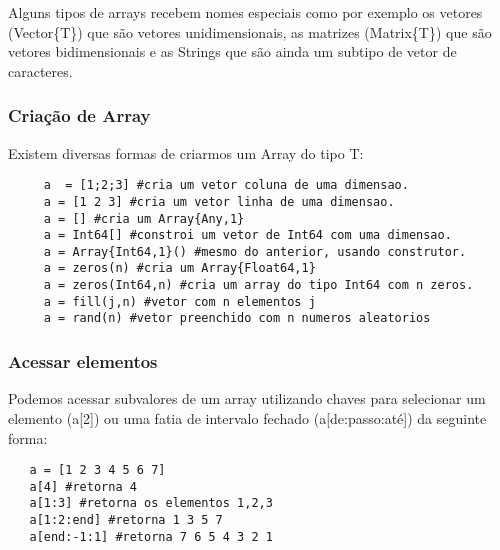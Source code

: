  Alguns tipos de arrays recebem nomes especiais como por exemplo os vetores (Vector\{T\}) que são vetores unidimensionais, as matrizes (Matrix\{T\}) que são vetores bidimensionais e as Strings que são ainda um subtipo de vetor de caracteres. 


\subsubsection{Criação de Array}
Existem diversas formas de criarmos um Array do tipo T:
\begin{lstlisting}
     a  = [1;2;3] #cria um vetor coluna de uma dimensao.
     a = [1 2 3] #cria um vetor linha de uma dimensao.
     a = [] #cria um Array{Any,1}
     a = Int64[] #constroi um vetor de Int64 com uma dimensao.
     a = Array{Int64,1}() #mesmo do anterior, usando construtor.
     a = zeros(n) #cria um Array{Float64,1}
     a = zeros(Int64,n) #cria um array do tipo Int64 com n zeros.
     a = fill(j,n) #vetor com n elementos j
     a = rand(n) #vetor preenchido com n numeros aleatorios
\end{lstlisting}

\subsubsection{Acessar elementos}
Podemos acessar subvalores de um array utilizando chaves para selecionar um elemento (a[2]) ou uma fatia de intervalo fechado (a[de:passo:até]) da seguinte forma:
\begin{lstlisting}
   a = [1 2 3 4 5 6 7] 
   a[4] #retorna 4
   a[1:3] #retorna os elementos 1,2,3
   a[1:2:end] #retorna 1 3 5 7
   a[end:-1:1] #retorna 7 6 5 4 3 2 1
\end{lstlisting}

